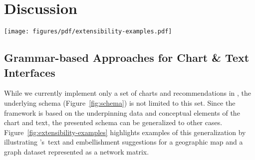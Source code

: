 \section{Discussion}

\begin{figure*}[t!]
    \centering    \texttt{[image: figures/pdf/extensibility-examples.pdf]}
    \caption{Examples illustrating the extensibility afforded by the proposed conceptual schema. Here, \pluto's text generation and recommendation modules are used \emph{as-is} to author text for a geographic map and an adjacency matrix. In (A), the system generates a description based on the map and subsequently highlights six states in the chart that are emphasized in the text. In (B), \pluto~suggests a sentence completion based on multimodal input of the previously drafted description and a user selection on the chart.}
    \label{fig:extensibility-examples}
\end{figure*}

\subsection{Grammar-based Approaches for Chart \& Text Interfaces}

While we currently implement only a set of charts and recommendations in \pluto, the underlying schema (Figure~\ref{fig:schema}) is not limited to this set.
Since the framework is based on the underpinning data and conceptual elements of the chart and text, the presented schema can be generalized to other cases.
Figure~\ref{fig:extensibility-examples} highlights examples of this generalization by illustrating \pluto's~text and embellishment suggestions for a geographic map and a graph dataset represented as a network matrix.

